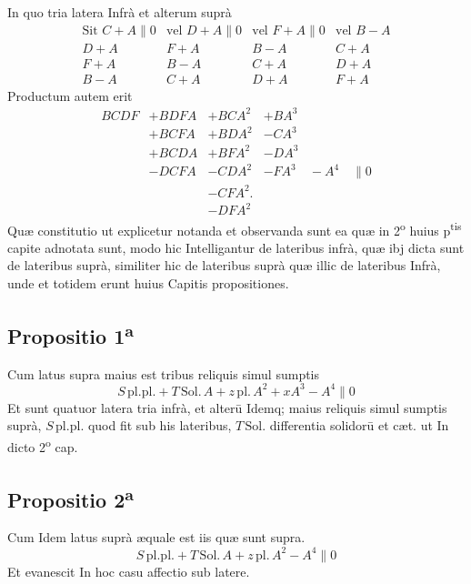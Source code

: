 \documentclass[11pt,a4paper]{article}
\begin{document}
In quo tria latera Infrà et alterum suprà
\[ \begin{array}{llll} \text{Sit } C + A \parallel 0 & \text{vel } D + A \parallel 0 & \text{vel } F + A \parallel 0 & \text{vel } B - A \\ D + A & F + A & B - A & C + A \\ F + A & B - A & C + A & D + A \\ B - A & C + A & D + A & F + A \end{array} \]
Productum autem erit
\[ \begin{array}{llll} BCDF & + BDFA & + BCA^{2} & + BA^{3} \\ & + BCFA & + BDA^{2} & - CA^{3} \\ & + BCDA & + BFA^{2} & - DA^{3} \\ & - DCFA & - CDA^{2} & - FA^{3} \quad - A^{4} \quad \parallel 0 \\ & & - CFA^{2}. & \\ & & - DFA^{2} & \end{array} \]
Quæ constitutio ut explicetur notanda et observanda sunt ea quæ in 2\textsuperscript{o} huius p\textsuperscript{tis} capite adnotata sunt, modo hic Intelligantur de lateribus infrà, quæ ibj dicta sunt de lateribus suprà, similiter hic de lateribus suprà quæ illic de lateribus Infrà, unde et totidem erunt huius Capitis propositiones.


\subsection*{Propositio 1\textsuperscript{a}}

Cum latus supra maius est tribus reliquis simul sumptis
\[ S\,\mathrm{pl.pl.} + T\,\mathrm{Sol.}\,A + z\,\mathrm{pl.}\,A^{2} + xA^{3} - A^{4} \parallel 0 \]
Et sunt quatuor latera tria infrà, et alterū Idemq; maius reliquis simul sumptis suprà, $S\,\mathrm{pl.pl.}$ quod fit sub his lateribus, $T\,\mathrm{Sol.}$ differentia solidorū et cæt. ut In dicto 2\textsuperscript{o} cap.

\subsection*{Propositio 2\textsuperscript{a}}

Cum Idem latus suprà æquale est iis quæ sunt supra.
\[ S\,\mathrm{pl.pl.} + T\,\mathrm{Sol.}\,A + z\,\mathrm{pl.}\,A^{2} - A^{4} \parallel 0 \]
Et evanescit In hoc casu affectio sub latere.
\end{document}
